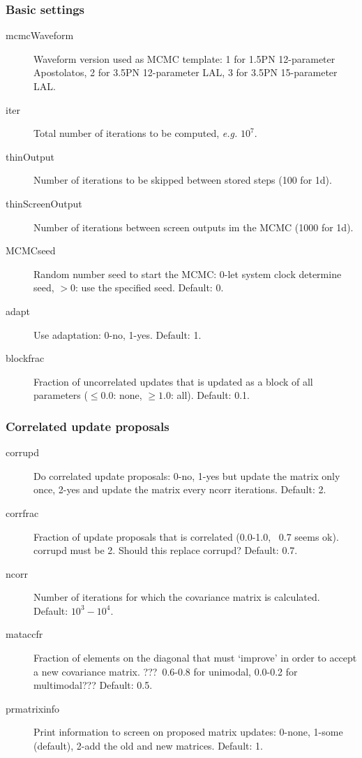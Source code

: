 \documentclass[10pt]{article}
\begin{document}
\subsubsection{Basic settings}
\begin{description}
\item[mcmcWaveform] Waveform version used as MCMC template:  1 for 1.5PN 12-parameter Apostolatos, 2 for 3.5PN 12-parameter LAL, 3 for 3.5PN 15-parameter LAL.
\item[iter] Total number of iterations to be computed, \textit{e.g.} $10^7$.
\item[thinOutput] Number of iterations to be skipped between stored steps (100 for 1d).
\item[thinScreenOutput] Number of iterations between screen outputs im the MCMC (1000 for 1d).
\item[MCMCseed] Random number seed to start the MCMC: 0-let system clock determine seed, $>0$: use the specified seed.  Default: 0.
\item[adapt] Use adaptation: 0-no, 1-yes.  Default: 1.
\item[blockfrac] Fraction of uncorrelated updates that is updated as a block of all parameters ($\leq 0.0$: none, $\geq 1.0$: all).  Default: 0.1.
\end{description}


\subsubsection{Correlated update proposals}
\begin{description}
\item[corrupd] Do correlated update proposals: 0-no, 1-yes but update the matrix only once, 2-yes and update the matrix every ncorr iterations.  Default: 2.
\item[corrfrac] Fraction of update proposals that is correlated (0.0-1.0, ~0.7 seems ok). corrupd must be 2. Should this replace corrupd?  Default: 0.7.
\item[ncorr] Number of iterations for which the covariance matrix is calculated.  Default: $10^3-10^4$.
\item[mataccfr] Fraction of elements on the diagonal that must `improve' in order to accept a new covariance matrix. ???~0.6-0.8 for unimodal, 0.0-0.2 for multimodal???  Default: 0.5.
\item[prmatrixinfo] Print information to screen on proposed matrix updates: 0-none, 1-some (default), 2-add the old and new matrices.  Default: 1.
\end{description}
\end{document}
